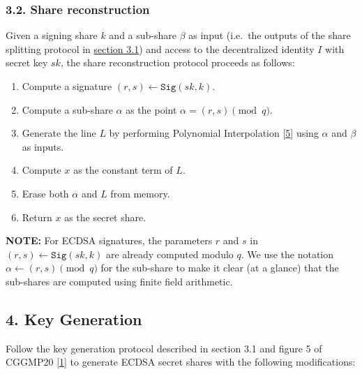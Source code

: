 \documentclass[
]{article}
\providecommand{\tightlist}{%
  \setlength{\itemsep}{0pt}\setlength{\parskip}{0pt}}
\begin{document}
\hypertarget{share-reconstruction}{%
\subsubsection{3.2. Share reconstruction}\label{share-reconstruction}}

Given a signing share \(k\) and a sub-share \(\beta\) as input (i.e.~the
outputs of the share splitting protocol in
\protect\hyperlink{share-splitting}{section 3.1}) and access to the
decentralized identity \(I\) with secret key \(sk\), the share
reconstruction protocol proceeds as follows:

\begin{enumerate}
\def\labelenumi{\arabic{enumi}.}
\tightlist
\item
  Compute a signature \((r, s) \leftarrow \mathtt{Sig}(sk, k)\).
\item
  Compute a sub-share \(\alpha\) as the point
  \(\alpha = (r, s) \pmod q\).
\item
  Generate the line \(L\) by performing Polynomial Interpolation
  {[}\protect\hyperlink{ref-wiki:interpolation}{5}{]} using \(\alpha\)
  and \(\beta\) as inputs.
\item
  Compute \(x\) as the constant term of \(L\).
\item
  Erase both \(\alpha\) and \(L\) from memory.
\item
  Return \(x\) as the secret share.
\end{enumerate}

\textbf{NOTE:} For ECDSA signatures, the parameters \(r\) and \(s\) in
\((r, s) \leftarrow \mathtt{Sig}(sk, k)\) are already computed modulo
\(q\). We use the notation \(\alpha \leftarrow (r, s) \pmod q\) for the
sub-share to make it clear (at a glance) that the sub-shares are
computed using finite field arithmetic.

\hypertarget{key-generation}{%
\subsection{4. Key Generation}\label{key-generation}}

Follow the key generation protocol described in section 3.1 and figure 5
of CGGMP20 {[}\protect\hyperlink{ref-cggmp20}{1}{]} to generate ECDSA
secret shares with the following modifications:
\end{document}
